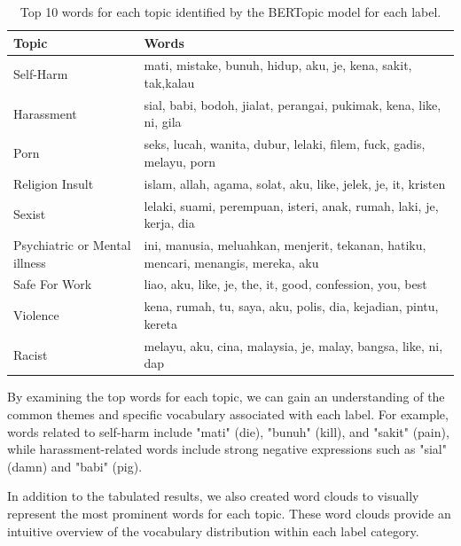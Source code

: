 \documentclass[preprint]{article}
\begin{document}
\begin{table}[h]
  \centering
  \begin{tabularx}{\textwidth}{|X|X|}
  \hline
  \textbf{Topic} & \textbf{Words} \\
  \hline
  Self-Harm & mati, mistake, bunuh, hidup, aku, je, kena, sakit, tak,kalau \\
  Harassment & sial, babi, bodoh, jialat, perangai, pukimak, kena, like, ni, gila \\
  Porn & seks, lucah, wanita, dubur, lelaki, filem, fuck, gadis, melayu, porn \\
  Religion Insult & islam, allah, agama, solat, aku, like, jelek, je, it, kristen \\
  Sexist & lelaki, suami, perempuan, isteri, anak, rumah, laki, je, kerja, dia \\
  Psychiatric or Mental illness & ini, manusia, meluahkan, menjerit, tekanan, hatiku, mencari, menangis, mereka, aku \\
  Safe For Work & liao, aku, like, je, the, it, good, confession, you, best \\
  Violence & kena, rumah, tu, saya, aku, polis, dia, kejadian, pintu, kereta \\
  Racist & melayu, aku, cina, malaysia, je, malay, bangsa, like, ni, dap \\
  \hline
  \end{tabularx}
  \caption{Top 10 words for each topic identified by the BERTopic model for each label.}
  \label{table:topics}
\end{table}



By examining the top words for each topic, we can gain an understanding of the common themes and specific vocabulary associated with each label. For example, words related to self-harm include "mati" (die), "bunuh" (kill), and "sakit" (pain), while harassment-related words include strong negative expressions such as "sial" (damn) and "babi" (pig).

In addition to the tabulated results, we also created word clouds to visually represent the most prominent words for each topic. These word clouds provide an intuitive overview of the vocabulary distribution within each label category.
\end{document}
